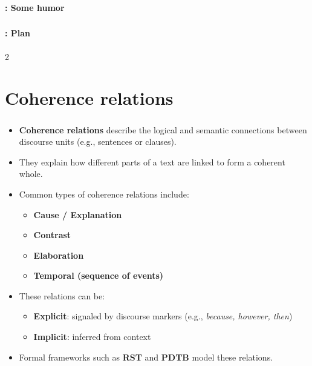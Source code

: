 \documentclass[xcolor=table]{beamer}
\begin{document}
\begin{frame}
	\frametitle{\inserttitle}
	\framesubtitle{\insertshortsubtitle: Some humor}

	\begin{center}
	\end{center}

\end{frame}

\begin{frame}
	\frametitle{\inserttitle}
	\framesubtitle{\insertshortsubtitle: Plan}

	\begin{multicols}{2}
	\tableofcontents
	\end{multicols}

\end{frame}

\section{Coherence relations}

\begin{frame}
	\frametitle{\insertshortsubtitle}
	\framesubtitle{\insertsection}
	
	\begin{itemize}
		\item \textbf{Coherence relations} describe the logical and semantic connections between discourse units (e.g., sentences or clauses).
		
		\item They explain how different parts of a text are linked to form a coherent whole.
		
		\item Common types of coherence relations include:
		\begin{itemize}
			\item \textbf{Cause / Explanation}
			\item \textbf{Contrast}
			\item \textbf{Elaboration}
			\item \textbf{Temporal (sequence of events)}
		\end{itemize}
		
		\item These relations can be:
		\begin{itemize}
			\item \textbf{Explicit}: signaled by discourse markers (e.g., \textit{because, however, then})
			\item \textbf{Implicit}: inferred from context
		\end{itemize}
		
		\item Formal frameworks such as \textbf{RST} and \textbf{PDTB} model these relations.
	\end{itemize}
	
\end{frame}
\end{document}
